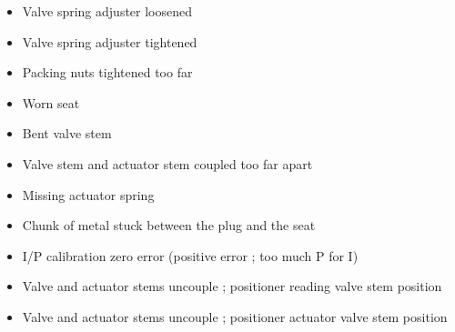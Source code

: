 \begin{itemize}
\item{} Valve spring adjuster loosened
\item{} Valve spring adjuster tightened
\item{} Packing nuts tightened too far
\item{} Worn seat
\item{} Bent valve stem
\item{} Valve stem and actuator stem coupled too far apart
\item{} Missing actuator spring
\item{} Chunk of metal stuck between the plug and the seat
\item{} I/P calibration zero error (positive error ; too much P for I)
\item{} Valve and actuator stems uncouple ; positioner reading valve stem position
\item{} Valve and actuator stems uncouple ; positioner actuator valve stem position
\end{itemize}





